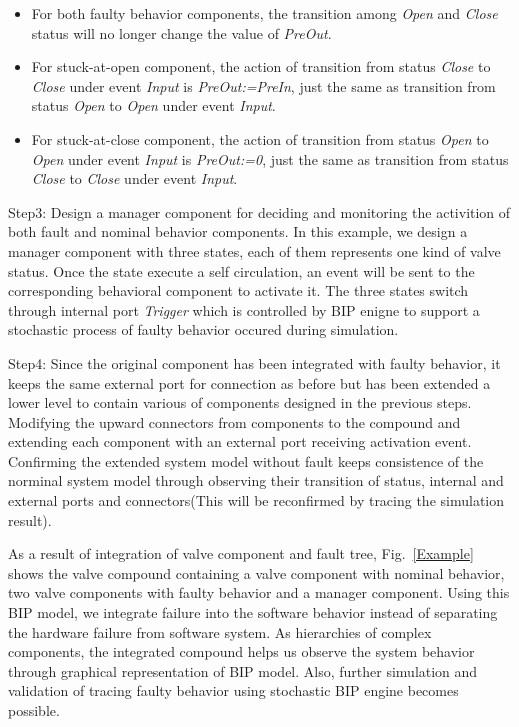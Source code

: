 \begin{itemize}
	\item For both faulty behavior components, the transition among \emph{Open} and \emph{Close} status will no longer change the value of \emph{PreOut}.
	\item For stuck-at-open component, the action of transition from status \emph{Close} to \emph{Close} under event \emph{Input} is \emph{PreOut:=PreIn}, just the same as transition from status \emph{Open} to \emph{Open} under event \emph{Input}.
	\item For stuck-at-close component, the action of transition from status \emph{Open} to \emph{Open} under event \emph{Input} is \emph{PreOut:=0}, just the same as transition from status \emph{Close} to \emph{Close} under event \emph{Input}.
\end{itemize}

Step3: Design a manager component for deciding and monitoring the activition of both fault and nominal behavior components. In this example, we design a manager component with three states, each of them represents one kind of valve status. Once the state execute a self circulation, an event will be sent to the corresponding behavioral component to activate it. The three states switch through internal port \emph{Trigger} which is controlled by BIP enigne to support a stochastic process of faulty behavior occured during simulation.

Step4: Since the original component has been integrated with faulty behavior, it keeps the same external port for connection  as before but has been extended a lower level to contain various of components designed in the previous steps. Modifying the upward connectors from components to the compound and extending each component with an external port receiving activation event. Confirming the extended system model without fault keeps consistence of the norminal system model through observing their transition of status, internal and external ports and connectors(This will be reconfirmed by tracing the simulation result).

As a result of integration of valve component and fault tree, Fig.~\ref{Example} shows the valve compound containing a valve component with nominal behavior, two valve components with faulty behavior and a manager component. Using this BIP model, we integrate failure into the software behavior instead of separating the hardware failure from software system. As hierarchies of complex components, the integrated compound helps us observe the system behavior through graphical representation of BIP model. Also, further simulation and validation of tracing faulty behavior using stochastic BIP engine becomes possible.

